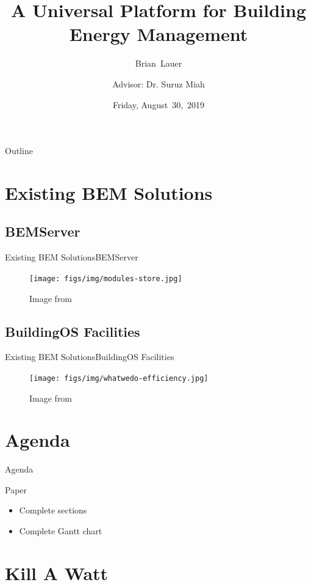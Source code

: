 \documentclass{beamer}
\title[Progress Update]{A Universal Platform for Building Energy Management}
\author[B.~Lauer]{Brian~Lauer \\\and
Advisor: Dr. Suruz Miah}
\institute[Bradley University] %
{
  Department of Electrical and Computer Engineering\\
  Bradley University\\
  1501 W. Bradley Avenue\\
  Peoria, IL, 61625, USA
}
\date[August~30,~2019]{Friday, August~30,~2019}
\begin{document}
\begin{frame}
  \titlepage
\end{frame}

\begin{frame}{Outline}
  \tableofcontents
\end{frame}

\section{Existing BEM Solutions}
\subsection{BEMServer}

\begin{frame}{Existing BEM Solutions}{BEMServer}
\begin{figure}
\texttt{[image: figs/img/modules-store.jpg]}
\caption{Image from \cite{nobatek2019}}
\end{figure}
\end{frame}

\subsection{BuildingOS Facilities}

\begin{frame}{Existing BEM Solutions}{BuildingOS Facilities}
\begin{figure}
\texttt{[image: figs/img/whatwedo-efficiency.jpg]}
\caption{Image from \cite{lucid2019}}
\end{figure}
\end{frame}

\section{Agenda}
\begin{frame}{Agenda}
\begin{block}{Paper}
\begin{itemize}
	\item Complete sections
	\item Complete Gantt chart
\end{itemize}
\end{block}
\end{frame}

\section{Kill A Watt}
\end{document}
